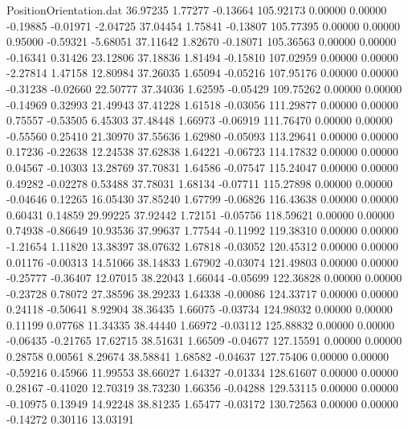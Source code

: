 \begin{filecontents}{PositionOrientation.dat}
  36.97235    1.77277   -0.13664   105.92173    0.00000    0.00000   -0.19885   -0.01971   -2.04725
  37.04454    1.75841   -0.13807   105.77395    0.00000    0.00000    0.95000   -0.59321   -5.68051
  37.11642    1.82670   -0.18071   105.36563    0.00000    0.00000   -0.16341    0.31426   23.12806
  37.18836    1.81494   -0.15810   107.02959    0.00000    0.00000   -2.27814    1.47158   12.80984
  37.26035    1.65094   -0.05216   107.95176    0.00000    0.00000   -0.31238   -0.02660   22.50777
  37.34036    1.62595   -0.05429   109.75262    0.00000    0.00000   -0.14969    0.32993   21.49943
  37.41228    1.61518   -0.03056   111.29877    0.00000    0.00000    0.75557   -0.53505    6.45303
  37.48448    1.66973   -0.06919   111.76470    0.00000    0.00000   -0.55560    0.25410   21.30970
  37.55636    1.62980   -0.05093   113.29641    0.00000    0.00000    0.17236   -0.22638   12.24538
  37.62838    1.64221   -0.06723   114.17832    0.00000    0.00000    0.04567   -0.10303   13.28769
  37.70831    1.64586   -0.07547   115.24047    0.00000    0.00000    0.49282   -0.02278    0.53488
  37.78031    1.68134   -0.07711   115.27898    0.00000    0.00000   -0.04646    0.12265   16.05430
  37.85240    1.67799   -0.06826   116.43638    0.00000    0.00000    0.60431    0.14859   29.99225
  37.92442    1.72151   -0.05756   118.59621    0.00000    0.00000    0.74938   -0.86649   10.93536
  37.99637    1.77544   -0.11992   119.38310    0.00000    0.00000   -1.21654    1.11820   13.38397
  38.07632    1.67818   -0.03052   120.45312    0.00000    0.00000    0.01176   -0.00313   14.51066
  38.14833    1.67902   -0.03074   121.49803    0.00000    0.00000   -0.25777   -0.36407   12.07015
  38.22043    1.66044   -0.05699   122.36828    0.00000    0.00000   -0.23728    0.78072   27.38596
  38.29233    1.64338   -0.00086   124.33717    0.00000    0.00000    0.24118   -0.50641    8.92904
  38.36435    1.66075   -0.03734   124.98032    0.00000    0.00000    0.11199    0.07768   11.34335
  38.44440    1.66972   -0.03112   125.88832    0.00000    0.00000   -0.06435   -0.21765   17.62715
  38.51631    1.66509   -0.04677   127.15591    0.00000    0.00000    0.28758    0.00561    8.29674
  38.58841    1.68582   -0.04637   127.75406    0.00000    0.00000   -0.59216    0.45966   11.99553
  38.66027    1.64327   -0.01334   128.61607    0.00000    0.00000    0.28167   -0.41020   12.70319
  38.73230    1.66356   -0.04288   129.53115    0.00000    0.00000   -0.10975    0.13949   14.92248
  38.81235    1.65477   -0.03172   130.72563    0.00000    0.00000   -0.14272    0.30116   13.03191

\end{filecontents}
